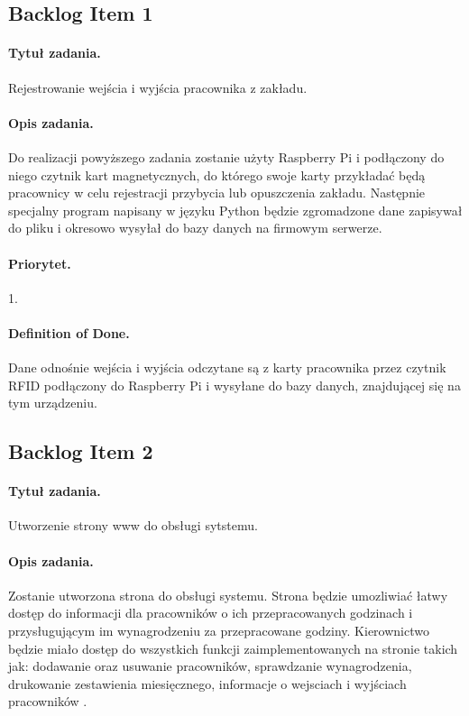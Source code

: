 \documentclass[a4paper]{article}
\begin{document}
\subsection{Backlog Item 1}
\paragraph{Tytuł zadania.} Rejestrowanie wejścia i wyjścia pracownika z zakładu.
\paragraph{Opis zadania.} Do realizacji powyższego zadania zostanie użyty Raspberry Pi i podłączony do niego czytnik kart magnetycznych, do którego swoje karty przykładać będą pracownicy w celu rejestracji przybycia lub opuszczenia zakładu. Następnie specjalny program napisany w języku Python będzie zgromadzone dane zapisywał do pliku i okresowo wysyłał do bazy danych na firmowym serwerze.
\paragraph{Priorytet.} 1.
\paragraph{Definition of Done.} Dane odnośnie wejścia i wyjścia odczytane są z karty pracownika przez czytnik RFID podłączony do Raspberry Pi i wysyłane do bazy danych, znajdującej się na tym urządzeniu.

\subsection{Backlog Item 2}
\paragraph{Tytuł zadania.} Utworzenie strony www do obsługi sytstemu.
\paragraph{Opis zadania.} Zostanie utworzona strona do obsługi systemu. Strona będzie umozliwiać łatwy dostęp do informacji dla pracowników o ich przepracowanych godzinach i przysługującym im wynagrodzeniu za przepracowane godziny. Kierownictwo będzie miało dostęp do wszystkich funkcji zaimplementowanych na stronie takich jak: dodawanie oraz usuwanie pracowników, sprawdzanie wynagrodzenia, drukowanie zestawienia miesięcznego, informacje o wejsciach i wyjściach pracowników .  
\end{document}
